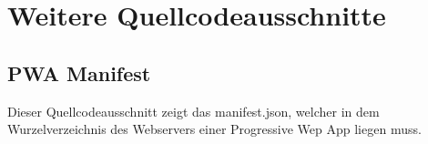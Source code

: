 \chapter{Weitere Quellcodeausschnitte}
\label{chap:WeitereQuellcodeausschnitte}

\section*{PWA Manifest}
Dieser Quellcodeausschnitt zeigt das manifest.json, welcher in dem Wurzelverzeichnis
des Webservers einer Progressive Wep App liegen muss.
\inputminted{jsx}{snippets/json/manifest.json}

